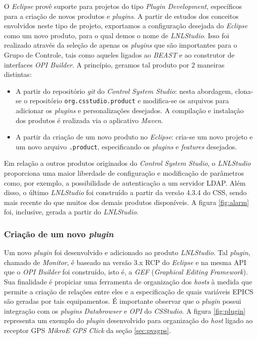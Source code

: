 O \textit{Eclipse} provê suporte para projetos do tipo \textit{Plugin
Development}, específicos para a criação de novos produtos e \textit{plugins}. A
partir de estudos dos conceitos envolvidos neste tipo de projeto, exportamos a
configuração desejada do \textit{Eclipse} como um novo produto, para o qual
demos o nome de \textit{LNLStudio}. Isso foi realizado através da seleção de
apenas os \textit{plugins} que são importantes para o Grupo de Controle, tais
como aqueles ligados ao \textit{BEAST} e ao construtor de interfaces \textit{OPI
Builder}. A princípio, geramos tal produto por 2 maneiras distintas:

\begin{itemize}\renewcommand\labelitemi{--}
  \item A partir do repositório \textit{git} do \textit{Control System Studio}:
 nesta abordagem, clona-se o repositório \texttt{org.csstudio.product} e
 modifica-se os arquivos para adicionar os \textit{plugins} e personalizações
 desejados. A compilação e instalação dos produtos é realizada via o aplicativo
 \textit{Maven}.

 \item A partir da criação de um novo produto no \textit{Eclipse}: cria-se um
 novo projeto e um novo arquivo \texttt{.product}, especificando os
 \textit{plugins} e \textit{features} desejados.
\end{itemize}

Em relação a outros produtos originados do \textit{Control System Studio}, o
\textit{LNLStudio} proporciona uma maior liberdade de configuração e modificação de parâmetros como, por
exemplo, a possibilidade de autenticação a um servidor LDAP. Além disso, o
último \textit{LNLStudio} foi construído a partir da versão 4.3.4 do CSS, sendo
mais recente do que muitos dos demais produtos disponíveis. A figura
\ref{fig:alarm} foi, inclusive, gerada a partir do \textit{LNLStudio}.

\subsubsection{Criação de um novo \textit{plugin}}

Um novo \textit{plugin} foi desenvolvido e adicionado ao produto
\textit{LNLStudio}. Tal \textit{plugin}, chamado de \textit{Monitor}, é baseado
na versão 3.x RCP do \textit{Eclipse} e na mesma API que o \textit{OPI Builder}
foi construído, isto é, a \textit{GEF} (\textit{Graphical Editing Framework}).
Sua finalidade é propiciar uma ferramenta de organização dos \textit{hosts} à
medida que permite a criação de relações entre eles e a especificação de quais
variáveis EPICS são geradas por tais equipamentos. É importante observar que o
\textit{plugin} possui integração com os \textit{plugins} \textit{Databrowser} e
\textit{OPI} do \textit{CSStudio}. A figura \ref{fig:plugin} representa um
exemplo do \textit{plugin} desenvolvido para organização do \textit{host} ligado
ao receptor GPS \textit{MikroE GPS Click} da seção \ref{sec:pvsgps}.

